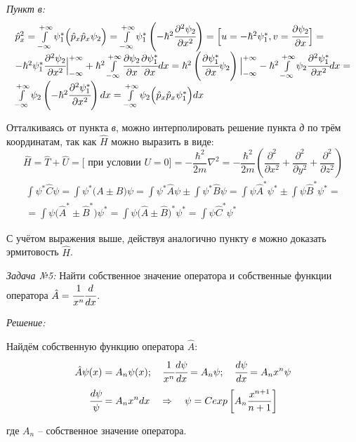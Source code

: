 \emph{Пункт в:}
\[
\begin{array}{ll}
	\hat{p}^2_x = \int\limits_{-\infty}^{+\infty} \psi_{1}^{*} \Big( \hat{p}_{x} 
		\hat{p}_{x} \psi_{2} \Big) = 
		\int\limits_{-\infty}^{+\infty} \psi_{1}^{*} \left( 
		-\hbar^{2} \cfrac{\partial^{2} \psi_{2}}{\partial x^2} \right) =
		\Big[ u = -\hbar^2 \psi_{1}^{*}, 
		v = \cfrac{\partial \psi_{2}}{\partial x} \Big] = \\
		-\hbar^{2} \psi_{1}^{*} \cfrac{\partial^{2} \psi_{2}}{\partial x^2} 
		\Big\vert_{-\infty}^{+\infty} + \hbar^{2} \int\limits_{-\infty}^{+\infty}
		\cfrac{\partial\psi_{2}}{\partial x}
		\cfrac{\partial\psi_{1}^{*}}{\partial x} dx =
		\hbar^{2}\left( 
		\cfrac{\partial\psi_{1}^{*}}{\partial x} \psi_{2}\right)
		\Big\vert_{-\infty}^{+\infty} -\hbar^{2} \int\limits_{-\infty}^{+\infty} 
		\psi_{2} \cfrac{\partial^{2}\psi_{1}^{*}}{\partial x^2} dx = \\
		\int\limits_{-\infty}^{+\infty} \psi_{2} 
		\left( -\hbar^{2} \cfrac{\partial^{2}\psi_{1}^{*}}{\partial x^2} \right)dx =
		\int\limits_{-\infty}^{+\infty} \psi_{2} 
		\Big( \hat{p}_{x} \hat{p}_{x} \psi_{1}^{*} \Big) dx 
\end{array}
\]

Отталкиваясь от пункта \emph{в}, можно интерполировать решение пункта \emph{д} по 
трём координатам, так как \( \hat{H} \) можно выразить в виде:
\[
	\hat{H} = \hat{T} + \hat{U} = \Big[ \text{ при условии } U = 0 \Big] = 
	-\frac{\hbar^2}{2m}\nabla^{2} = -\frac{\hbar^2}{2m}\left( 
	\frac{\partial^2}{\partial x^2} + \frac{\partial^2}{\partial y^2} + 
	\frac{\partial^2}{\partial z^2}\right)
\]
\[
\begin{array}{ll}
	\int \psi^{*} \hat{C} \psi = \int \psi^{*} \Big( A \pm B \Big) \psi = 
	\int \psi^{*} \hat{A} \psi \pm \int \psi^{*} \hat{B} \psi = 
	\int \psi \hat{A}^{*} \psi^{*} \pm \int \psi \hat{B}^{*} \psi^{*} = \\ =
	\int \psi \Big( \hat{A}^{*} \pm \hat{B}^{*} \Big) \psi^{*} = 
	\int \psi \Big( \hat{A} \pm \hat{B} \Big)^{*} \psi^{*} = 
	\int \psi \hat{C}^{*} \psi^{*}
\end{array}
\]

С учётом выражения выше, действуя аналогично пункту \emph{в} можно доказать 
эрмитовость \( \hat{H} \).

\pagebreak

\emph{Задача №5:} Найти собственное значение оператора и собственные функции 
оператора \( \hat{A} = \cfrac{1}{x^n}\cfrac{d}{dx} \).

\emph{Решение:}

Найдём собственную функцию оператора \( \hat{A} \):
\[
	\hat{A}\psi(x) = A_n \psi(x); \quad
	\cfrac{1}{x^n}\cfrac{d\psi}{dx} = A_n\psi; \quad
	\cfrac{d\psi}{dx} = A_n x^n \psi
\]
\[
	\cfrac{d\psi}{\psi} = A_n x^n dx \quad \Rightarrow \quad
	\psi = C exp\left[ A_n \frac{x^{n+1}}{n+1} \right]
\]

где \( A_n \) -- собственное значение оператора.



